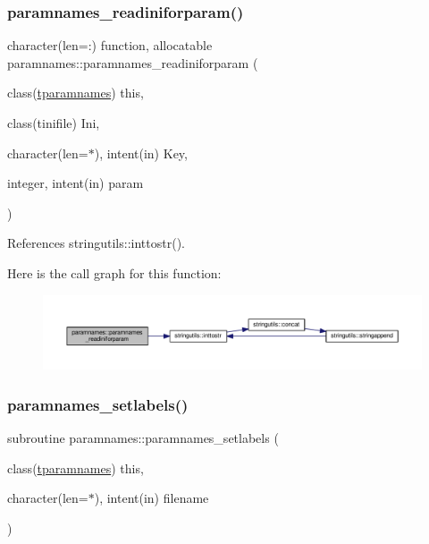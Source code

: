 \subsubsection{\texorpdfstring{paramnames\+\_\+readiniforparam()}{paramnames\_readiniforparam()}}
{\footnotesize\ttfamily character(len=\+:) function, allocatable paramnames\+::paramnames\+\_\+readiniforparam (\begin{DoxyParamCaption}\item[{class(\mbox{\hyperlink{structparamnames_1_1tparamnames}{tparamnames}})}]{this,  }\item[{class(tinifile)}]{Ini,  }\item[{character(len=$\ast$), intent(in)}]{Key,  }\item[{integer, intent(in)}]{param }\end{DoxyParamCaption})\hspace{0.3cm}{\ttfamily [private]}}



References stringutils\+::inttostr().

Here is the call graph for this function\+:
\nopagebreak
\begin{figure}[H]
\begin{center}
\leavevmode
\includegraphics[width=350pt]{namespaceparamnames_ad3d4b6760fe5b48b0754c2d2f7f0b909_cgraph}
\end{center}
\end{figure}
\mbox{\label{namespaceparamnames_a84f661e30d02319c827007cbbe6b587c}} 
\subsubsection{\texorpdfstring{paramnames\+\_\+setlabels()}{paramnames\_setlabels()}}
{\footnotesize\ttfamily subroutine paramnames\+::paramnames\+\_\+setlabels (\begin{DoxyParamCaption}\item[{class(\mbox{\hyperlink{structparamnames_1_1tparamnames}{tparamnames}})}]{this,  }\item[{character(len=$\ast$), intent(in)}]{filename }\end{DoxyParamCaption})\hspace{0.3cm}{\ttfamily [private]}}

